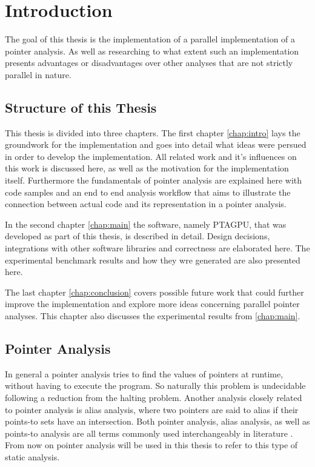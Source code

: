 \chapter{Introduction} \label{chap:intro}
The goal of this thesis is the implementation of a parallel implementation of a pointer analysis. As well as researching to what extent such an implementation presents advantages or disadvantages over other analyses that are not strictly parallel in nature.

\section{Structure of this Thesis}
This thesis is divided into three chapters.
The first chapter \autoref{chap:intro} lays the groundwork for the implementation and goes into detail what ideas were persued in order to develop the implementation. All related work and it's influences on this work is discussed here, as well as the motivation for the implementation itself. Furthermore the fundamentals of pointer analysis are explained here with code samples and an end to end analysis workflow that aims to illustrate the connection between actual code and its representation in a pointer analysis.

In the second chapter \autoref{chap:main} the software, namely PTAGPU, that was developed as part of this thesis, is described in detail. Design decisions, integrations with other software libraries and correctness are elaborated here.
The experimental benchmark results and how they wre generated are also presented here.

The last chapter \autoref{chap:conclusion} covers possible future work that could further improve the implementation and explore more ideas concerning parallel pointer analyses.
This chapter also discusses the experimental results from \autoref{chap:main}.


\section{Pointer Analysis}
In general a pointer analysis tries to find the values of pointers at runtime, without having to execute the program.
So naturally this problem is undecidable \cite{landi1992undecidability} following a reduction from the halting problem.
Another analysis closely related to pointer analysis is alias analysis, where two pointers are said to alias if their points-to sets have an intersection. Both pointer analysis, alias analysis, as well as points-to analysis are all terms commonly used interchangeably in literature \cite{hind2001pointer}. From now on pointer analysis will be used in this thesis to refer to this type of static analysis.

